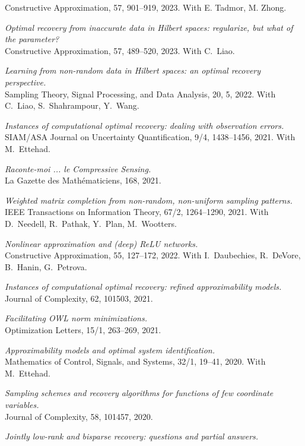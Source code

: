 \documentclass[11pt]{article}
\begin{document}
Constructive Approximation, 57, 901--919, 2023. With E. Tadmor, M.  Zhong.
\item {\sl Optimal recovery from inaccurate data in Hilbert spaces: regularize, but what of the parameter?}\\
Constructive Approximation, 57, 489--520, 2023.  With C.~Liao.
\item {\sl Learning from non-random data in Hilbert spaces: an optimal recovery perspective.}\\
Sampling Theory, Signal Processing, and Data Analysis,
20, 5, 2022.
With C.~Liao, S.~Shahrampour, Y.~Wang. 
\item {\sl Instances of computational optimal recovery: dealing with observation errors.}\\
SIAM/ASA Journal on Uncertainty Quantification, 9/4, 1438--1456, 2021. 
With M.~Ettehad.
\item {\sl Raconte-moi ... le Compressive Sensing.}\\
La Gazette des Math\'ematiciens, 168, 2021. 
\item {\sl Weighted matrix completion from non-random, non-uniform sampling patterns.}\\
IEEE Transactions on Information Theory, 67/2, 1264--1290, 2021.
With D.~Needell, R.~Pathak, Y.~Plan, \mbox{M.~Wootters}.
\item {\sl Nonlinear approximation and (deep) ReLU networks.}\\
Constructive Approximation,  55, 127--172, 2022.
With I.~Daubechies, R.~DeVore, B.~Hanin, G.~Petrova.
\item {\sl Instances of computational optimal recovery: refined approximability models.}\\
Journal of Complexity, 62, 101503, 2021.
\item {\sl Facilitating OWL norm minimizations.}\\
Optimization Letters, 15/1, 263--269, 2021.
\item {\sl Approximability models and optimal system identification.}\\
Mathematics of Control, Signals, and Systems, 32/1, 19--41, 2020.
With M.~Ettehad.
\item {\sl Sampling schemes and recovery algorithms for functions of few coordinate variables.}\\
Journal of Complexity, 58, 101457, 2020.
\item {\sl Jointly low-rank and bisparse recovery: questions and partial answers.}\\
\end{document}

